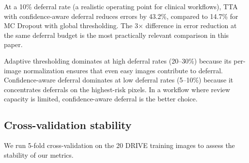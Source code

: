\begin{table}[H]
\centering
\caption{Error reduction at fixed deferral rates (5\%, 10\%, 20\%, 30\%)
for each combination of uncertainty method and deferral strategy. Values
are pixel-wise error reduction ratios. Confidence-aware deferral
consistently dominates at low deferral rates.}
\label{tab:threshold_sensitivity}
\small
\setlength{\tabcolsep}{4.6pt}
\end{table}

At a 10\% deferral rate (a realistic operating point for clinical workflows),
TTA with confidence-aware deferral reduces errors by 43.2\%, compared to
14.7\% for MC Dropout with global thresholding. The 3$\times$ difference
in error reduction at the same deferral budget is the most practically
relevant comparison in this paper.

Adaptive thresholding dominates at high deferral rates (20--30\%) because
its per-image normalization ensures that even easy images contribute to
deferral. Confidence-aware deferral dominates at low deferral rates (5--10\%)
because it concentrates deferrals on the highest-risk pixels. In a
workflow where review capacity is limited, confidence-aware deferral
is the better choice.

\subsection{Cross-validation stability}

We run 5-fold cross-validation on the 20 DRIVE training images to assess
the stability of our metrics.

